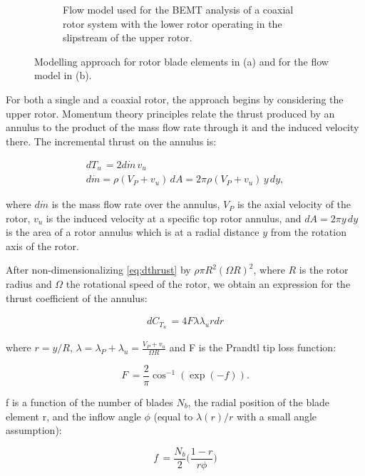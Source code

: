 \begin{figure}[]
\begin{subfigure}[t]{0.5\textwidth}
    \caption{Flow model used for the BEMT analysis of a coaxial rotor system with the lower rotor operating in the slipstream of the upper rotor. }
    \label{fig:disks}
\end{subfigure}
    \captionsetup{justification=centering}
    \caption{Modelling approach for rotor blade elements in (a) and for the flow model in (b).}
    \label{fig:BEMT}
\end{figure}


For both a single and a coaxial rotor, the approach begins by considering the upper rotor. Momentum theory principles relate the thrust produced by an annulus to the product of the mass flow rate through it and the induced velocity there. The incremental thrust on the annulus is:

\begin{align}
 dT_u\, = 2d\dot{m}\, v_u \label{eq:dthrust} \\
  d\dot{m} = \rho(V_P+v_u)\,dA = 2\pi\rho(V_P+v_u)\,y\, dy,
\end{align}

where $d\dot{m}$ is the mass flow rate over the annulus, $V_P$ is the axial velocity of the rotor, $v_u$ is the induced velocity at a specific top rotor annulus, and $dA = 2\pi y\, dy$ is the area of a rotor annulus which is at a radial distance $y$ from the rotation axis of the rotor.

After non-dimensionalizing \autoref{eq:dthrust} by $\rho \pi R^2 (\Omega R)^2$, where $R$ is the rotor radius and $\Omega$ the rotational speed of the rotor, we obtain an expression for the thrust coefficient of the annulus:

\begin{align}
 dC_{T_u}\, = 4 F \lambda \lambda_u r dr \label{eq:dCthrust} 
\end{align}

where $r=y/R$, $\lambda= \lambda_P+\lambda_u = \frac{V_P+v_u}{\Omega R}$ and F is the Prandtl tip loss function:

\begin{equation}
 F\, = \frac{2}{\pi} \cos^{-1}(\exp(-f)). \label{eq:prandtl} 
\end{equation}

f is a function of the number of blades $N_b$, the radial position of the blade element r, and the inflow angle $\phi$ (equal to $\lambda(r)/r$ with a small angle assumption):

\begin{equation}
 f\, = \frac{N_b}{2} \Big(\frac{1-r}{r \phi} \Big) \label{eq:f}
\end{equation}

